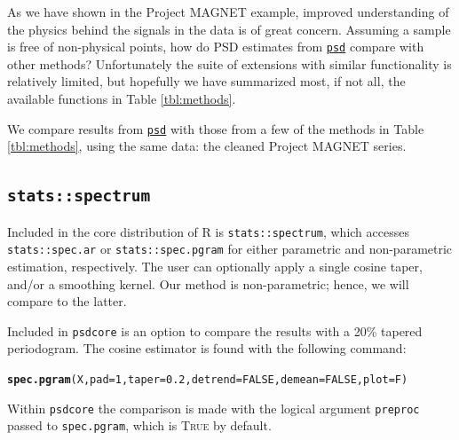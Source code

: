 \documentclass{article}\usepackage{graphicx, color}
\makeatletter
\newcommand{\hlfunctioncall}[1]{\textcolor[rgb]{0.501960784313725,0,0.329411764705882}{\textbf{#1}}}%
\newenvironment{kframe}{%
 \def\at@end@of@kframe{}%
 \ifinner\ifhmode%
  \def\at@end@of@kframe{\end{minipage}}%
  \begin{minipage}{\columnwidth}%
 \fi\fi%
 \def\FrameCommand##1{\hskip\@totalleftmargin \hskip-\fboxsep
 \colorbox{shadecolor}{##1}\hskip-\fboxsep
     \hskip-\linewidth \hskip-\@totalleftmargin \hskip\columnwidth}%
 \MakeFramed {\advance\hsize-\width
   \@totalleftmargin\z@ \linewidth\hsize
   \@setminipage}}%
 {\par\unskip\endMakeFramed%
 \at@end@of@kframe}
\newenvironment{knitrout}{}{} %
\newcommand{\SC}[1]{\textsc{#1}}
\newcommand{\Rcmd}[1]{\texttt{#1}}
\newcommand{\psd}[0]{\href{http://abarbour.github.com/psd/}{\color{blue}\Rcmd{psd}}}
\makeatother
\begin{document}
As we have shown in the Project MAGNET example, 
improved understanding of the physics behind the signals in the data
is of great concern.
Assuming a sample is free of non-physical points, how do
PSD estimates from \psd{}
compare with other methods?
Unfortunately the suite of extensions with similar functionality
is relatively limited, but hopefully we have
summarized most, if not all, the available functions in Table \ref{tbl:methods}.



We compare results from
\psd{} with those from a few of the methods in Table \ref{tbl:methods},
using the same data: the cleaned Project MAGNET series.

\subsection{\Rcmd{stats::spectrum}}

Included in the core distribution of R is \Rcmd{stats::spectrum}, which
accesses \Rcmd{stats::spec.ar} or \Rcmd{stats::spec.pgram} for either
parametric and non-parametric estimation, respectively.  
The user can optionally apply a single cosine taper, and/or a smoothing kernel.
Our method is non-parametric; hence, we will compare to the latter.

Included in \Rcmd{psdcore} is an option to compare the 
results with a 20\% tapered periodogram.
The cosine estimator is found with the following command:
\begin{knitrout}
\color{fgcolor}\begin{kframe}
\begin{alltt}
\hlfunctioncall{spec.pgram}(X, pad = 1, taper = 0.2, detrend = FALSE, demean = FALSE, plot = F)
\end{alltt}
\end{kframe}
\end{knitrout}

Within \Rcmd{psdcore} the comparison is
made with
the logical argument \Rcmd{preproc} 
passed to \Rcmd{spec.pgram}, which is \SC{True} by default.
\end{document}
